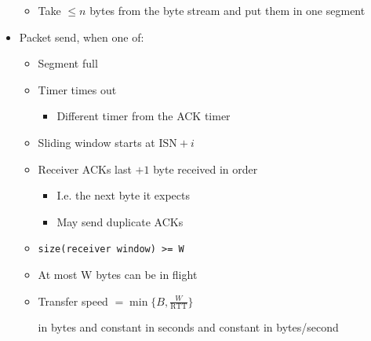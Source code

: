 \begin{itemize}
\begin{itemize}
            \item Take $\le n$ bytes from the byte stream and put them in one segment
        \end{itemize}
    \item Packet send, when one of:
        \begin{itemize}
            \item Segment full
            \item Timer times out
                \begin{itemize}
                    \item Different timer from the ACK timer
                \end{itemize}
        \end{itemize}
        \begin{itemize}
             Number of the first byte to send
                \begin{itemize}
                    \item Chosen at random
                        \begin{itemize}
                            \item For security reason
                            \item Prevent confusion of packets when reusing ports
                        \end{itemize}
                \end{itemize}
            \item Sliding window starts at $\text{ISN} + i$
            \item Receiver ACKs last $+ 1$ byte received in order
                \begin{itemize}
                    \item I.e. the next byte it expects
                    \item May send duplicate ACKs
                \end{itemize}
        \end{itemize}
        \begin{itemize}
             Number of bytes the sender can send starting at the next expected byte
            \item \verb+size(receiver window) >= W+
            \item At most W bytes can be in flight
            \item Transfer speed $= \min \{B, \frac{W}{\text{RTT}}\}$
                \begin{itemize}
                     in bytes and constant
                     in seconds and constant
                     in bytes/second
                \end{itemize}
        \end{itemize}
\end{itemize}

